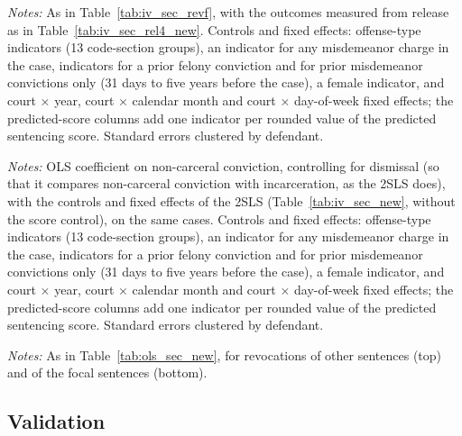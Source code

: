 \documentclass[11pt]{article}
\newcommand{\tabnote}[1]{\par\vspace{0.6ex}\begin{minipage}{\linewidth}\linespread{1}\footnotesize\textit{Notes:} #1\end{minipage}}
\newcommand{\controlsnote}{offense-type indicators (13 code-section groups), an indicator for any misdemeanor charge in the case, indicators for a prior felony conviction and for prior misdemeanor convictions only (31 days to five years before the case), a female indicator, and court $\times$ year, court $\times$ calendar month and court $\times$ day-of-week fixed effects}
\newcommand{\specnotesec}{Controls and fixed effects: \controlsnote; the predicted-score columns add one indicator per rounded value of the predicted sentencing score. Standard errors clustered by defendant.}
\begin{document}
\begin{table}[H]
\centering
\caption{2SLS from release, time served at most four years: revocations of the focal sentences, secondary analysis}\label{tab:iv_sec_rel4_revf}
{\small\linespread{1}\selectfont\renewcommand{\arraystretch}{0.9}}
\tabnote{As in Table~\ref{tab:iv_sec_revf}, with the outcomes measured from release as in Table~\ref{tab:iv_sec_rel4_new}. \specnotesec}
\end{table}

\begin{table}[H]
\centering
\caption{OLS from the disposition: non-carceral conviction and new felony cases, secondary analysis}\label{tab:ols_sec_new}
{\small\linespread{1}\selectfont\renewcommand{\arraystretch}{0.9}}
\tabnote{OLS coefficient on non-carceral conviction, controlling for dismissal (so that it compares non-carceral conviction with incarceration, as the 2SLS does), with the controls and fixed effects of the 2SLS (Table~\ref{tab:iv_sec_new}, without the score control), on the same cases. \specnotesec}
\end{table}

\begin{table}[H]
\centering
\caption{OLS from the disposition: non-carceral conviction and revocations, secondary analysis}\label{tab:ols_sec_rev}
{\small\linespread{1}\selectfont\renewcommand{\arraystretch}{0.9}}\par\medskip
{\small\linespread{1}\selectfont\renewcommand{\arraystretch}{0.9}}
\tabnote{As in Table~\ref{tab:ols_sec_new}, for revocations of other sentences (top) and of the focal sentences (bottom).}
\end{table}

\subsection{Validation}
\end{document}
